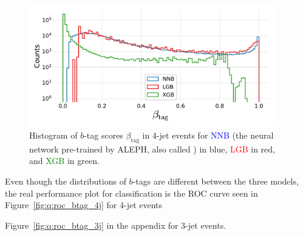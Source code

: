 \begin{figure}
  \includegraphics[width=0.95\textwidth, trim=0 0 0 30, clip]{figures/quarks/y_pred_4_jet_hist-down_sample=1.00-ML_vars=vertex-selection=b-ejet_min=4-n_iter_RS_lgb=99-n_iter_RS_xgb=9-cdot_cut=0.90-version=19.pdf}
  \caption[$b$-Tag Scores in 4-Jet Events]
          {Histogram of $b$-tag scores $\beta_\mathrm{tag}$ in 4-jet events for \textcolor{blue}{NNB} (the neural network pre-trained by ALEPH, also called ) in blue, \textcolor{red}{LGB} in red, and \textcolor{green}{XGB} in green. 
          } 
  \label{fig:q:btag_scores_4j}
\end{figure}

Even though the distributions of $b$-tags are different between the three models, the real performance plot for classification is the ROC curve seen in Figure~\ref{fig:q:roc_btag_4j} for 4-jet events

Figure~\ref{fig:q:roc_btag_3j} in the appendix for 3-jet events.

